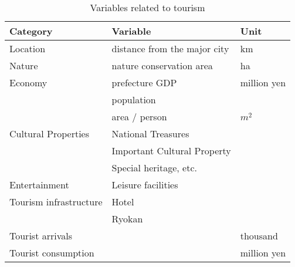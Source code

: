 \documentclass[10pt, conference, compsocconf]{IEEEtran}
\begin{document}
\begin{table}[!h]\caption{Variables related to tourism}\label{data}
\centering
\begin{tabular}{l|l|l}
\hline
\bf Category & \bf Variable & \bf Unit \\\hline
Location & distance from the major city& km \\\hline
Nature & nature conservation area &ha\\\hline
Economy & prefecture GDP & million yen\\
 & population & \\
 & area / person& $m^2$\\\hline
Cultural Properties & National Treasures &  \\
 & Important Cultural Property  &  \\
 & Special heritage, etc.  \\\hline
Entertainment & Leisure facilities \\\hline
Tourism infrastructure & Hotel \\
 & Ryokan  \\\hline
Tourist arrivals & & thousand\\
Tourist consumption &  & million yen \\\hline %
\end{tabular}
\end{table}
\end{document}
